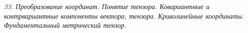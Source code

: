 \emph{33. Преобразование координат. Понятие тензора. Ковариантные и
контрвариантные компоненты вектора, тензора. Криволинейные координаты.
Фундаментальный метрический тензор.}

\newpage
